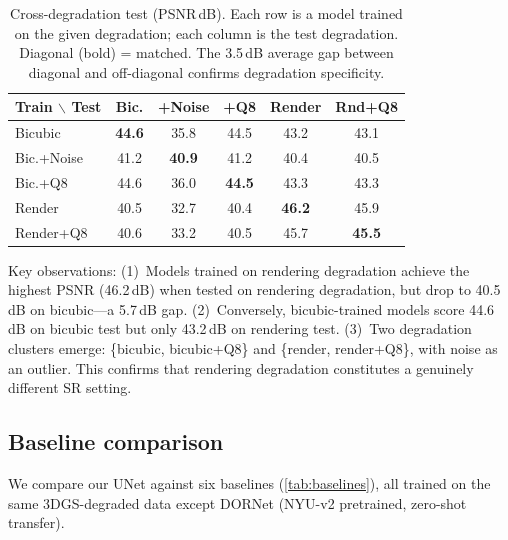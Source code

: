 \documentclass[10pt,twocolumn,letterpaper]{article}
\begin{document}
\begin{table}[t]
\centering
\caption{Cross-degradation test (PSNR\,dB). Each row is a model trained on the given degradation; each column is the test degradation. Diagonal (bold) = matched. The 3.5\,dB average gap between diagonal and off-diagonal confirms degradation specificity.}
\label{tab:crosstest}
\small
\setlength{\tabcolsep}{3pt}
\begin{tabular}{@{}lccccc@{}}
\toprule
Train $\backslash$ Test & Bic. & +Noise & +Q8 & Render & Rnd+Q8 \\
\midrule
Bicubic      & \textbf{44.6} & 35.8 & 44.5 & 43.2 & 43.1 \\
Bic.+Noise   & 41.2 & \textbf{40.9} & 41.2 & 40.4 & 40.5 \\
Bic.+Q8      & 44.6 & 36.0 & \textbf{44.5} & 43.3 & 43.3 \\
Render       & 40.5 & 32.7 & 40.4 & \textbf{46.2} & 45.9 \\
Render+Q8    & 40.6 & 33.2 & 40.5 & 45.7 & \textbf{45.5} \\
\bottomrule
\end{tabular}
\vspace{-1em}
\end{table}

Key observations:
(1)~Models trained on rendering degradation achieve the highest PSNR (46.2\,dB) when tested on rendering degradation, but drop to 40.5\,dB on bicubic---a 5.7\,dB gap.
(2)~Conversely, bicubic-trained models score 44.6\,dB on bicubic test but only 43.2\,dB on rendering test.
(3)~Two degradation clusters emerge: \{bicubic, bicubic+Q8\} and \{render, render+Q8\}, with noise as an outlier.
This confirms that rendering degradation constitutes a genuinely different SR setting.

\subsection{Baseline comparison}
\label{sec:baselines}

We compare our UNet against six baselines (\cref{tab:baselines}), all trained on the same 3DGS-degraded data except DORNet (NYU-v2 pretrained, zero-shot transfer).
\end{document}
